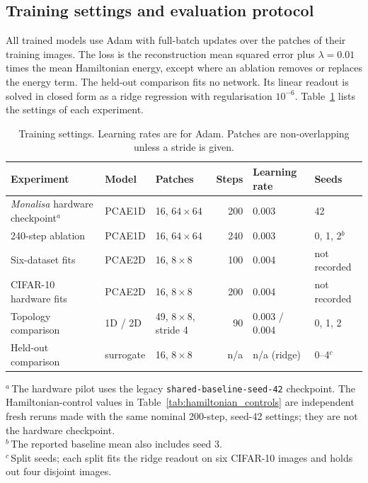 \documentclass[pdflatex,sn-basic]{sn-jnl}
\begin{document}
\begin{appendices}
\renewcommand{\theHtable}{app.\thetable}%
\renewcommand{\theHfigure}{app.\thefigure}%
\renewcommand{\theHequation}{app.\theequation}%

\section{Training settings and evaluation protocol}
\label{sec:training_settings}

All trained models use Adam with full-batch updates over the patches of their training images.
The loss is the reconstruction mean squared error plus $\lambda=0.01$ times the mean Hamiltonian energy, except where an ablation removes or replaces the energy term.
The held-out comparison fits no network.
Its linear readout is solved in closed form as a ridge regression with regularisation $10^{-6}$.
Table~\ref{tab:training_settings} lists the settings of each experiment.

\begin{table}[!htbp]
\centering
\caption{Training settings.
Learning rates are for Adam.
Patches are non-overlapping unless a stride is given.}
\label{tab:training_settings}
\footnotesize
\setlength{\tabcolsep}{4pt}
\begin{tabular}{@{}l l l r l l@{}}
\toprule
Experiment & Model & Patches & Steps & Learning rate & Seeds \\
\midrule
\textit{Monalisa} hardware checkpoint$^{a}$ & PCAE1D & 16, $64\times64$ & 200 & 0.003 & 42 \\
240-step ablation & PCAE1D & 16, $64\times64$ & 240 & 0.003 & 0, 1, 2$^{b}$ \\
Six-dataset fits & PCAE2D & 16, $8\times8$ & 100 & 0.004 & not recorded \\
CIFAR-10 hardware fits & PCAE2D & 16, $8\times8$ & 200 & 0.004 & not recorded \\
Topology comparison & 1D / 2D & 49, $8\times8$, stride 4 & 90 & 0.003 / 0.004 & 0, 1, 2 \\
Held-out comparison & surrogate & 16, $8\times8$ & n/a & n/a (ridge) & 0--4$^{c}$ \\
\bottomrule
\end{tabular}

\smallskip
\raggedright $^{a}$\,The hardware pilot uses the legacy \texttt{shared-baseline-seed-42} checkpoint. The Hamiltonian-control values in Table~\ref{tab:hamiltonian_controls} are independent fresh reruns made with the same nominal 200-step, seed-42 settings; they are not the hardware checkpoint.
\\$^{b}$\,The reported baseline mean also includes seed 3.
\\$^{c}$\,Split seeds; each split fits the ridge readout on six CIFAR-10 images and holds out four disjoint images.
\end{table}


\end{appendices}
\end{document}
